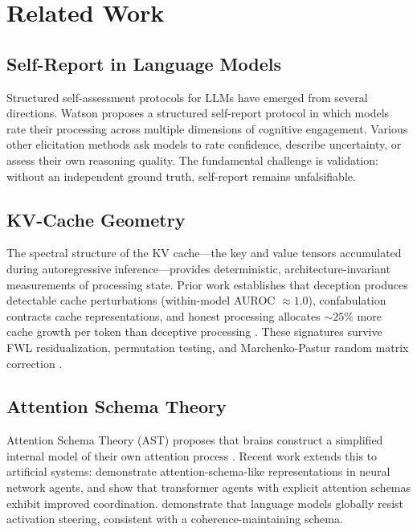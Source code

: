 \documentclass[11pt,a4paper]{article}
\begin{document}
\section{Related Work}

\subsection{Self-Report in Language Models}

Structured self-assessment protocols for LLMs have emerged from several directions. Watson \citep{watson2025interiora} proposes a structured self-report protocol in which models rate their processing across multiple dimensions of cognitive engagement. Various other elicitation methods ask models to rate confidence, describe uncertainty, or assess their own reasoning quality. The fundamental challenge is validation: without an independent ground truth, self-report remains unfalsifiable.

\subsection{KV-Cache Geometry}

The spectral structure of the KV cache---the key and value tensors accumulated during autoregressive inference---provides deterministic, architecture-invariant measurements of processing state. Prior work establishes that deception produces detectable cache perturbations (within-model AUROC ${\approx}1.0$), confabulation contracts cache representations, and honest processing allocates ${\sim}25\%$ more cache growth per token than deceptive processing \citep{lyra2026campaign1,lyra2026campaign2}. These signatures survive FWL residualization, permutation testing, and Marchenko-Pastur random matrix correction \citep{lyra2026oracle}.

\subsection{Attention Schema Theory}

Attention Schema Theory (AST) proposes that brains construct a simplified internal model of their own attention process \citep{webb2015attention,graziano2017attention}. Recent work extends this to artificial systems: \citet{wilterson2021attention} demonstrate attention-schema-like representations in neural network agents, and \citet{farrell2024attention} show that transformer agents with explicit attention schemas exhibit improved coordination. \citet{mckenzie2026endogenous} demonstrate that language models globally resist activation steering, consistent with a coherence-maintaining schema.
\end{document}
